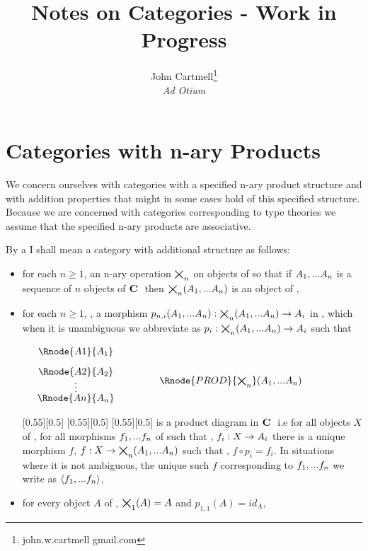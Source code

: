 \documentclass[10pt,a4paper]{scrartcl}
\title{Notes on Categories - Work in Progress}
\author{John Cartmell\footnote{john.w.cartmell gmail.com}\\ \normalsize{\textit{Ad Otium}}}
\begin{document}


\section{Categories with n-ary Products} 
We concern ourselves with categories with a specified n-ary product structure and 
 with addition properties that might in some cases hold of this specified structure.  
Because we are concerned with categories corresponding to type theories we assume that the specified n-ary products are associative.
\begin{definition}
By a  I shall mean a category \catcw with additional structure as follows:
\begin{itemize}
\item for each $n \geq 1$, an n-ary operation $\bigtimes_{n}$ on objects of \catcw so that if $A_1,...A_n$ is a sequence of $n$ objects of $\textbf{C}\ $ then $\bigtimes_{n}(A_1,...A_n)$ is an object of \catc,
\item for each $n \geq 1$, \foreachi, a morphism $p_{n,i}(A_1,...A_n):\bigtimes_{n}(A_1,...A_n) \rightarrow A_i$ in \catc, which when it is unambiguous we abbreviate as $p_i: \bigtimes_{n}(A_1,...A_n) \rightarrow A_i$
 such that

\begin{center}
\begin{displaymath}
\begin{array}{cp{.9cm}cp{.9cm}c}
\Rnode{A1}{A_1} & &   & &              \\ [0.3cm]
\Rnode{A2}{A_2} & &   & &              \\ [-0.1cm]
 \raisebox{-0.3cm}{\vdots} & & \Rnode{PROD}{\productn}(\An)  & &  \\ [0.2cm]
\Rnode{An}{A_n} & &   & & 
\end{array}
\end{displaymath}
\end{center}
[0.55][0.5]
{
\setlength{\arroffsetA}{2pt}
\setlength{\arroffsetA}{0pt}
}
[0.55][0.5]
{
\setlength{\arroffsetA}{2pt}
\setlength{\arroffsetA}{0pt}
}
[0.55][0.5]
is a product diagram in $\textbf{C}\ $ i.e for all objects $X$ of \catcw, for all morphisms $f_1,...f_n$ of \catcw such that \foreachi, $f_i:X \rightarrow A_i$ there is a unique
morphism $f$, $f: X \rightarrow \bigtimes_{n}(A_1,...A_n)$ such that \foreachi, $f \circ p_i = f_i$. In situations where it is not ambiguous, the unique such $f$ corresponding to $f_1,...f_n$ we write as
$\langle f_1,...f_n\rangle$,
\item
for every object $A$ of \catc, $\bigtimes_{1}(A)=A$ and $p_{1,1}(A) = id_A$,


\end{itemize}
\end{definition}
\end{document}
